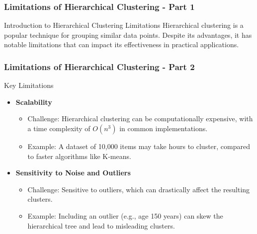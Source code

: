 \documentclass[aspectratio=169]{beamer}
\begin{document}
\begin{frame}[fragile]
    \frametitle{Limitations of Hierarchical Clustering - Part 1}
    \begin{block}{Introduction to Hierarchical Clustering Limitations}
        Hierarchical clustering is a popular technique for grouping similar data points. Despite its advantages, it has notable limitations that can impact its effectiveness in practical applications.
    \end{block}
\end{frame}

\begin{frame}[fragile]
    \frametitle{Limitations of Hierarchical Clustering - Part 2}
    \begin{block}{Key Limitations}
        \begin{itemize}
            \item \textbf{Scalability}
                \begin{itemize}
                    \item Challenge: Hierarchical clustering can be computationally expensive, with a time complexity of $O(n^3)$ in common implementations. 
                    \item Example: A dataset of 10,000 items may take hours to cluster, compared to faster algorithms like K-means.
                \end{itemize}

            \item \textbf{Sensitivity to Noise and Outliers}
                \begin{itemize}
                    \item Challenge: Sensitive to outliers, which can drastically affect the resulting clusters. 
                    \item Example: Including an outlier (e.g., age 150 years) can skew the hierarchical tree and lead to misleading clusters.
                \end{itemize}
        \end{itemize}
    \end{block}
\end{frame}
\end{document}
